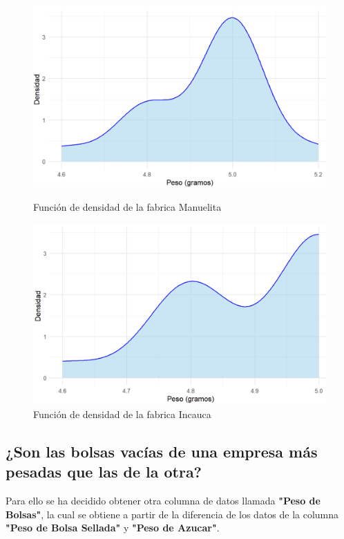 \documentclass[12pt]{article}
\begin{document}
	
	\begin{figure}[ht]
		\centering 
		\begin{minipage}{0.45\textwidth} 
			\centering
			\includegraphics[width=\linewidth]{img/densidad1} 
			\caption{Función de densidad de la fabrica Manuelita} 
			\label{fig:densidad1}
		\end{minipage}
		\hfill 
		\begin{minipage}{0.45\textwidth} 
			\centering
			\includegraphics[width=\linewidth]{img/densidad2}
			\caption{Función de densidad de la fabrica Incauca}
			\label{fig:densidad2}
		\end{minipage}
	\end{figure}
	
	\subsection{¿Son las bolsas vacías de una empresa más pesadas que las de la otra? }
	Para ello se ha decidido obtener otra columna de datos llamada \textbf{"Peso de Bolsas"}, la cual se obtiene a partir de la diferencia de los datos de la columna \textbf{"Peso de Bolsa Sellada"} y \textbf{"Peso de Azucar"}. 
	
\end{document}
